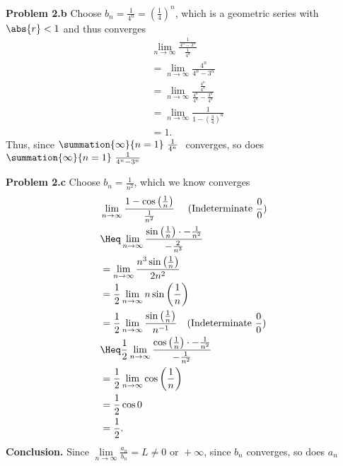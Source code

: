\documentclass{report}
\begin{document}
    \pagebreak \bigbreak \noindent 
    \textbf{Problem 2.b} Choose $b_{n} = \frac{1}{4^{n}} = \left(\frac{1}{4}\right)^{n}$, which is a geometric series with $\abs{r}  < 1$ and thus converges
    \begin{align*}
        &\lim\limits_{n \to \infty}{\frac{\frac{1}{4^{n} -3^{n}}}{\frac{1}{4^{n}}}}  \\
        &=\lim\limits_{n \to \infty}{\frac{4^{n}}{4^{n} -3^{n}}} \\
        &=\lim\limits_{n \to \infty}{\frac{\frac{4^{n}}{4^{n}}}{\frac{4^{n}}{4^{n}}-\frac{3^{n}}{4^{n}}}} \\
        &=\lim\limits_{n \to \infty}{\frac{1}{1-\left(\frac{3}{4}\right)^{n}}} \\
        &=1
    .\end{align*}
    \bigbreak \noindent 
    Thus, since $\summation{\infty}{n=1}\ \frac{1}{4^{n}}\  $ converges, so does $\summation{\infty}{n=1}\ \frac{1}{4^{n} -3^{n}}\  $

    \bigbreak \noindent 
    \textbf{Problem 2.c} Choose $b_{n}  =\frac{1}{n^{2}}$, which we know converges
    \begin{align*}
        &\lim\limits_{n \to \infty}{\frac{1-\cos{\left(\frac{1}{n}\right)}}{\frac{1}{n^{2}}}}\ \quad \text{(Indeterminate $\frac{0}{0}$)} \\
        &\Heq\lim\limits_{n \to \infty}{\frac{\sin{\left(\frac{1}{n}\right)}\cdot -\frac{1}{n^{2}}}{-\frac{2}{n^{3}}}} \\
        &=\lim\limits_{n \to \infty}{\frac{n^{3}\sin{\left(\frac{1}{n}\right)}}{2n^{2}}} \\
        &=\frac{1}{2}\lim\limits_{n \to \infty}{n\sin{\left(\frac{1}{n}\right)}} \\
        &=\frac{1}{2}\lim\limits_{n \to \infty}{\frac{\sin{\left(\frac{1}{n}\right)}}{n^{-1}}} \quad \text{(Indeterminate $\frac{0}{0}$)} \\
        &\Heq \frac{1}{2}\lim\limits_{n \to \infty}{\frac{\cos{\left(\frac{1}{n}\right)}\cdot -\frac{1}{n^{2}}}{-\frac{1}{n^{2}}}} \\
        &=\frac{1}{2}\lim\limits_{n \to \infty}{\cos{\left(\frac{1}{n}\right)}} \\
        &=\frac{1}{2}\cos{0} \\
        &=\frac{1}{2}
    .\end{align*}
    \bigbreak \noindent 
    \textbf{Conclusion.}  Since $\lim\limits_{n \to \infty}{\frac{a_{n}}{b_{n}}} = L \ne 0 \text{ or } +\infty$, since $b_{n}$ converges, so does $a_{n}$ 
    





    
    
\end{document}
